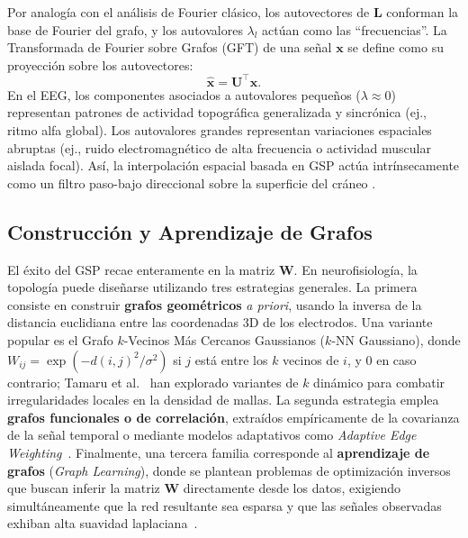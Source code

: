 Por analogía con el análisis de Fourier clásico, los autovectores de $\mathbf{L}$ conforman la base de Fourier del grafo, y los autovalores $\lambda_l$ actúan como las ``frecuencias''. La Transformada de Fourier sobre Grafos (GFT) de una señal $\mathbf{x}$ se define como su proyección sobre los autovectores:
\begin{equation}
    \hat{\mathbf{x}} = \mathbf{U}^\top \mathbf{x}.
\end{equation}
En el EEG, los componentes asociados a autovalores pequeños ($\lambda \approx 0$) representan patrones de actividad topográfica generalizada y sincrónica (ej., ritmo alfa global). Los autovalores grandes representan variaciones espaciales abruptas (ej., ruido electromagnético de alta frecuencia o actividad muscular aislada focal). Así, la interpolación espacial basada en GSP actúa intrínsecamente como un filtro paso-bajo direccional sobre la superficie del cráneo \cite{goerttler_understanding_2023}.

\subsection{Construcción y Aprendizaje de Grafos}

El éxito del GSP recae enteramente en la matriz $\mathbf{W}$. En neurofisiología, la topología puede diseñarse utilizando tres estrategias generales. La primera consiste en construir \textbf{grafos geométricos} \textit{a priori}, usando la inversa de la distancia euclidiana entre las coordenadas 3D de los electrodos. Una variante popular es el Grafo $k$-Vecinos Más Cercanos Gaussianos ($k$-NN Gaussiano), donde $W_{ij} = \exp(-d(i,j)^2/\sigma^2)$ si $j$ está entre los $k$ vecinos de $i$, y $0$ en caso contrario; Tamaru et al.~\cite{tamaru_optimizing_2024} han explorado variantes de $k$ dinámico para combatir irregularidades locales en la densidad de mallas. La segunda estrategia emplea \textbf{grafos funcionales o de correlación}, extraídos empíricamente de la covarianza de la señal temporal o mediante modelos adaptativos como \textit{Adaptive Edge Weighting}~\cite{karasuyama_adaptive_2017}. Finalmente, una tercera familia corresponde al \textbf{aprendizaje de grafos} (\textit{Graph Learning}), donde se plantean problemas de optimización inversos que buscan inferir la matriz $\mathbf{W}$ directamente desde los datos, exigiendo simultáneamente que la red resultante sea esparsa y que las señales observadas exhiban alta suavidad laplaciana~\cite{kalofolias_how_2016, qiao_data-driven_2018}.

